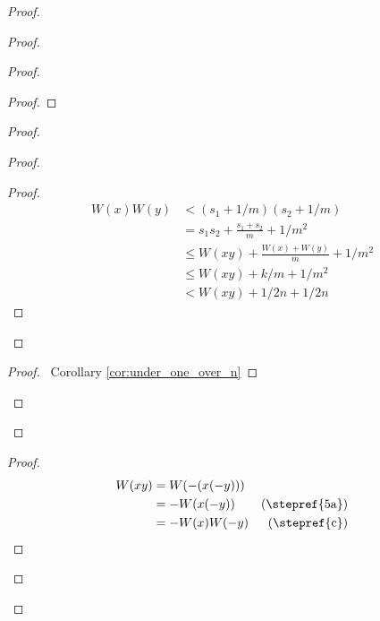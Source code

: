 \documentclass{article}
\theoremstyle{definition}
\begin{document}
\begin{proof}
\begin{proof}
\begin{proof}
\begin{proof}
                \end{proof}
                \begin{proof}
                    \begin{proof}
                        \begin{proof}
                            \pf
                            \begin{align*}
                                W(x) W(y) & < (s_1 + 1/m) (s_2 + 1/m) \\
                                & = s_1 s_2 + \frac{s_1 + s_2}{m} + 1/m^2 \\
                                & \leq W(xy) + \frac{W(x) + W(y)}{m} + 1/m^2 \\
                                & \leq W(xy) + k/m + 1/m^2 \\
                                & < W(xy) + 1/2n + 1/2n
                            \end{align*}
                        \end{proof}
                    \end{proof}
                    \begin{proof}
                        \pf\ Corollary \ref{cor:under_one_over_n}
                    \end{proof}
                \end{proof}
            \end{proof}
            \begin{proof}
                \pf
                \begin{align*}
                    W(xy) & = W(-(x(-y))) \\
                    & = -W(x(-y)) & (\text{\stepref{5a}}) \\
                    & = -W(x)W(-y) & (\text{\stepref{c}}) \\

\end{align*}
\end{proof}
\end{proof}
\end{proof}
\end{document}
